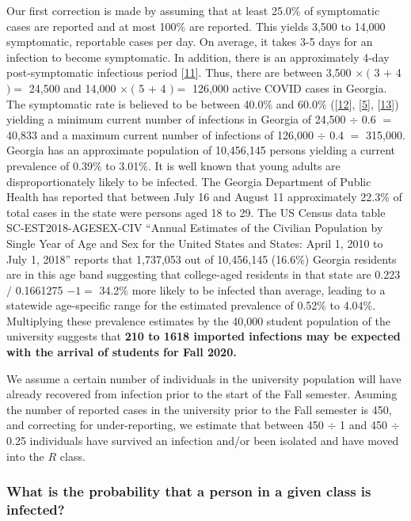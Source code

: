 \documentclass[
]{article}
\begin{document}
Our first correction is made by assuming that at least 25.0\% of
symptomatic cases are reported and at most 100\% are reported. This
yields 3,500 to 14,000 symptomatic, reportable cases per day. On
average, it takes 3-5 days for an infection to become symptomatic. In
addition, there is an approximately 4-day post-symptomatic infectious
period {[}\protect\hyperlink{ref-He2020-pq}{11}{]}. Thus, there are
between 3,500 \(\times~(\) 3 \(+\) 4 \() =\) 24,500 and 14,000
\(\times~(\) 5 \(+\) 4 \() =\) 126,000 active COVID cases in Georgia.
The symptomatic rate is believed to be between 40.0\% and 60.0\%
({[}\protect\hyperlink{ref-Pollan2020-xb}{12}{]},
{[}\protect\hyperlink{ref-Oran2020-aq}{5}{]},
{[}\protect\hyperlink{ref-Mizumoto2020-qc}{13}{]}) yielding a minimum
current number of infections in Georgia of 24,500 \(\div\) 0.6 \(=\)
40,833 and a maximum current number of infections of 126,000 \(\div\)
0.4 \(=\) 315,000. Georgia has an approximate population of 10,456,145
persons yielding a current prevalence of 0.39\% to 3.01\%. It is well
known that young adults are disproportionately likely to be infected.
The Georgia Department of Public Health has reported that between July
16 and August 11 approximately 22.3\% of total cases in the state were
persons aged 18 to 29. The US Census data table SC-EST2018-AGESEX-CIV
``Annual Estimates of the Civilian Population by Single Year of Age and
Sex for the United States and States: April 1, 2010 to July 1, 2018''
reports that 1,737,053 out of 10,456,145 (16.6\%) Georgia residents are
in this age band suggesting that college-aged residents in that state
are 0.223 \(/\) 0.1661275 \(-1=\) 34.2\% more likely to be infected than
average, leading to a statewide age-specific range for the estimated
prevalence of 0.52\% to 4.04\%. Multiplying these prevalence estimates
by the 40,000 student population of the university suggests that
\textbf{210 to 1618 imported infections may be expected with the arrival
of students for Fall 2020.}

We assume a certain number of individuals in the university population
will have already recovered from infection prior to the start of the
Fall semester. Asuming the number of reported cases in the university
prior to the Fall semester is 450, and correcting for under-reporting,
we estimate that between 450 \(\div\) 1 and 450 \(\div\) 0.25
individuals have survived an infection and/or been isolated and have
moved into the \(R\) class.

\hypertarget{what-is-the-probability-that-a-person-in-a-given-class-is-infected}{%
\subsubsection{What is the probability that a person in a given class is
infected?}\label{what-is-the-probability-that-a-person-in-a-given-class-is-infected}}
\end{document}
